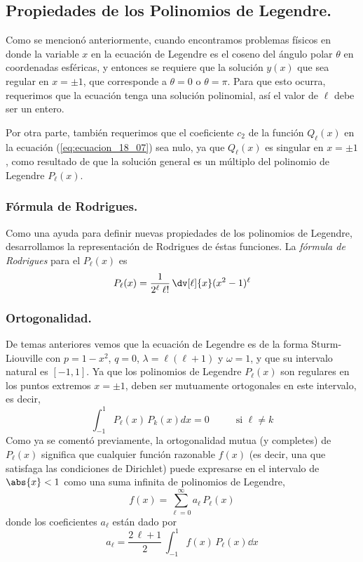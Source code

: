 \subsection{Propiedades de los Polinomios de Legendre.}
Como se mencionó anteriormente, cuando encontramos problemas físicos en donde la variable $x$ en la ecuación de Legendre es el coseno del ángulo polar $\theta$ en coordenadas esféricas, y entonces se requiere que la solución $y(x)$ que sea regular en $x = \pm 1$, que corresponde a $\theta = 0$ o $\theta = \pi$. Para que esto ocurra, requerimos que la ecuación tenga una solución polinomial, así el valor de $\ell$ debe ser un entero.
\par
Por otra parte, también requerimos que el coeficiente $c_{2}$ de la función $Q_{\ell}(x)$ en la ecuación (\ref{eq:ecuacion_18_07}) sea nulo, ya que $Q_{\ell}(x)$ es singular en $x = \pm 1$, como resultado de que la solución general es un múltiplo del polinomio de Legendre $P_{\ell}(x)$.
\subsubsection{Fórmula de Rodrigues.}
Como una ayuda para definir nuevas propiedades de los polinomios de Legendre, desarrollamos la representación de Rodrigues de éstas funciones. La \emph{fórmula de Rodrigues} para el $P_{\ell} (x)$ es
\begin{align}
P_{\ell} (x) = \dfrac{1}{2^{\ell} \; \ell !} \, \dv[\ell]{x}  (x^{2} - 1)^{\ell}
\label{eq:ecuacion_18_09}
\end{align}
\subsubsection{Ortogonalidad.}
De temas anteriores vemos que la ecuación de Legendre es de la forma Sturm-Liouville con $p = 1 - x^{2}$, $q = 0$, $\lambda = \ell (\ell + 1)$ y $\omega = 1$, y que su intervalo natural es $[-1, 1 ]$. Ya que los polinomios de Legendre $P_{\ell} (x)$ son regulares en los puntos extremos $x = \pm 1$, deben ser mutuamente ortogonales en este intervalo, es decir,
\begin{equation}
\int_{-1}^{1} P_{\ell}(x) \, P_{k}(x) dx = 0 \hspace{1cm} \text{ si } \ell \neq k
\label{eq:ecuacion_18_12}
\end{equation}
Como ya se comentó previamente, la ortogonalidad mutua (y completes) de  $P_{\ell} (x)$ significa que cualquier función razonable $f(x)$ (es decir, una que satisfaga las condiciones de Dirichlet) puede expresarse en el intervalo de $\abs{x} <1$ como una suma infinita de polinomios de Legendre,
\begin{equation}
f(x) = \sum_{\ell = 0}^{\infty} a_{\ell} \, P_{\ell} (x)
\label{eq:ecuacion_18_13}
\end{equation}
donde los coeficientes $a_{\ell}$ están dado por
\begin{equation}
a_{\ell} = \dfrac{2 \, \ell + 1}{2} \, \int_{-1}^{1} f(x) \, P_{\ell} (x) \dd{x}
\label{eq:ecuacion_18_14}
\end{equation}
